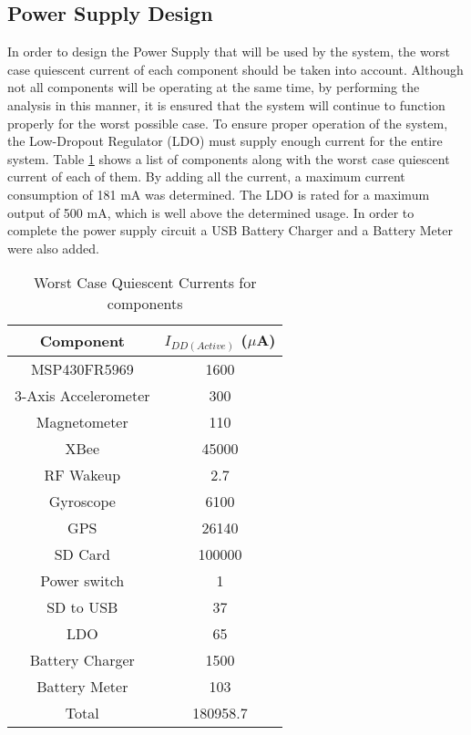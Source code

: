 \subsection{Power Supply Design}
In order to design the Power Supply that will be used by the system, the worst case quiescent current of each component should be taken into account.  Although not all components will be operating at the same time, by performing the analysis in this manner, it is ensured that the system will continue to function properly for the worst possible case.  To ensure proper operation of the system, the Low-Dropout Regulator (LDO) must supply enough current for the entire system.  Table \ref{tab:powerSupply} shows a list of components along with the worst case quiescent current of each of them.  By adding all the current, a maximum current consumption of 181 mA was determined.  The LDO is rated for a maximum output of 500 mA, which is well above the determined usage. In order to complete the power supply circuit a USB Battery Charger and a Battery Meter were also added.  
\begin{table}[H]
  \centering
  \caption{Worst Case Quiescent Currents for components}
    \begin{tabular}{|c|c|}
     \hline
     \rowcolor{Gray}
    Component & $I_{DD(Active)}$ ($\mu$A) \\
     \hline \hline
    MSP430FR5969 & 1600   \\ \hline
    3-Axis Accelerometer & 300  \\ \hline
    Magnetometer & 110  \\ \hline
    XBee  & 45000 \\ \hline
    RF Wakeup & 2.7   \\ \hline
    Gyroscope & 6100  \\ \hline
    GPS   & 26140 \\ \hline
    SD Card & 100000  \\ \hline
    Power switch & 1  \\ \hline
    SD to USB & 37   \\ \hline
    LDO   & 65  \\ \hline
    Battery Charger & 1500  \\ \hline
    Battery Meter & 103   \\ \hline \hline
    Total & 180958.7  \\ \hline     
    \end{tabular}%
  \label{tab:powerSupply}%
\end{table}%

